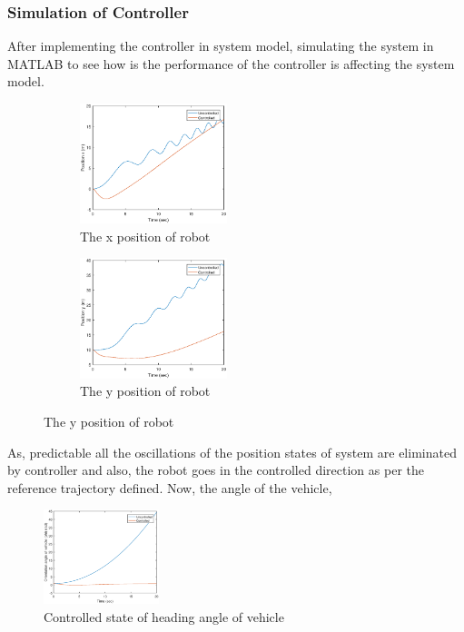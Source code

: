 \documentclass[12pt]{article}
\begin{document}
\subsubsection{Simulation of Controller}
After implementing the controller in system model, simulating the system in MATLAB to see how is the performance of the controller is affecting the system model.

\begin{figure}[H]
\begin{subfigure}{0.5\textwidth}
\includegraphics[width=0.7\linewidth, height=3.5cm]{state_x.eps}
\captionsetup{labelformat=empty}
\caption{The x position of robot}
\end{subfigure}
\begin{subfigure}{0.5\textwidth}
\includegraphics[width=0.7\linewidth, height=3.5cm]{state_y.eps}
\captionsetup{labelformat=empty}
\caption{The y position of robot}
\end{subfigure}
\end{figure}

As, predictable all the oscillations of the position states of system are eliminated by controller and also, the robot goes in the controlled direction as per the reference trajectory defined.
Now, the angle of the vehicle, 
\begin{figure}[H]
\centering
\includegraphics[width=0.3\textwidth]{state_phi.eps}
\captionsetup{labelformat=empty}
\caption{Controlled state of heading angle of vehicle}
\end{figure}
\end{document}
